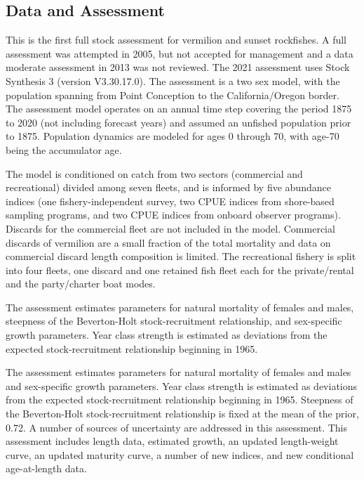 \documentclass[11pt,
  english,
  a4paper,
]{article}
\begin{document}
\FloatBarrier


\hypertarget{data-and-assessment}{%
\subsection*{Data and Assessment}\label{data-and-assessment}}

\leavevmode\tagmcend\tagstructend

This is the first full stock assessment for vermilion and sunset rockfishes. A full assessment was attempted in 2005, but not accepted for management and a data moderate assessment in 2013 was not reviewed. The 2021 assessment uses Stock Synthesis 3 (version V3.30.17.0). The assessment is a two sex model, with the population spanning from Point Conception to the California/Oregon border. The assessment model operates on an annual time step covering the period 1875 to 2020 (not including forecast years) and assumed an unfished population prior to 1875. Population dynamics are modeled for ages 0 through 70, with age-70 being the accumulator age.

The model is conditioned on catch from two sectors (commercial and recreational) divided among seven fleets, and is informed by five abundance indices (one fishery-independent survey, two CPUE indices from shore-based sampling programs, and two CPUE indices from onboard observer programs). Discards for the commercial fleet are not included in the model. Commercial discards of vermilion are a small fraction of the total mortality and data on commercial discard length composition is limited. The recreational fishery is split into four fleets, one discard and one retained fish fleet each for the private/rental and the party/charter boat modes.

The assessment estimates parameters for natural mortality of females and males, steepness of the Beverton-Holt stock-recruitment relationship, and sex-specific growth parameters. Year class strength is estimated as deviations from the expected stock-recruitment relationship beginning in 1965.

The assessment estimates parameters for natural mortality of females and males and sex-specific growth parameters. Year class strength is estimated as deviations from the expected stock-recruitment relationship beginning in 1965. Steepness of the Beverton-Holt stock-recruitment relationship is fixed at the mean of the prior, 0.72. A number of sources of uncertainty are addressed in this assessment. This assessment includes length data, estimated growth, an updated length-weight curve, an updated maturity curve, a number of new indices, and new conditional age-at-length data.
\end{document}
